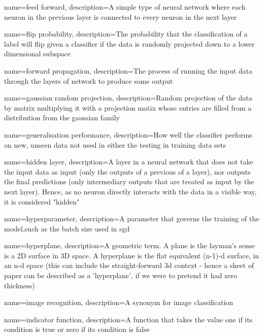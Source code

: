 {
    name=feed forward,
    description={A simple type of neural network where each neuron in the previous layer is connected to every neuron in the next layer} 
}

{
    name=flip probability,
    description={The probability that the classification of a label will flip given a classifier if the data is randomly projected down to a lower dimensional subspace}
}

{
    name=forward propagation,
    description={The process of running the input data through the layers of network to produce some output}
}

{
    name=gaussian random projection,
    description={Random projection of the data by matrix multiplying it with a projection matix whose entries are filled from a distribution from the gaussian family}
}

{
    name=generalisation performance,
    description={How well the classifier performs on new, unseen data not used in either the testing in training data sets}
}

 {
    name=hidden layer,
    description={A layer in a neural network that does not take the input data as input (only the outputs of a previous of a layer), nor outputs the final predictions (only intermediary outputs that are treated as input by the next layer). Hence, as no neuron directly interacts with the data in a visible way, it is considered "hidden"}
}

{
    name=hyperparameter,
    description={A parameter that governs the training of the model,such as the batch size used in \gls{sgd}} 
}

{
    name=hyperplane,
    description={A geometric term. A plane is the layman's sense is a 2D surface in 3D space. A hyperplane is the flat equivalent (n-1)-d surface, in an n-d space (this can include the straight-forward 3d context - hence a sheet of paper can be described as a 'hyperplane', if we were to pretend it had zero thickness)}
}

{
    name=image recognition,
    description={A synonym for image classification}
}

{
    name=indicator function,
    description={A function that takes the value one if its condition is true or zero if its condition is false}
}

